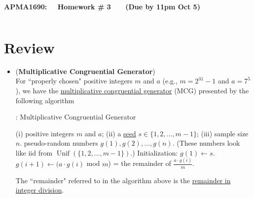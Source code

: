 \documentclass[11pt,letterpaper, leqno]{article}
\begin{document}
\begin{center}
{\bf \Large APMA1690: ~~Homework \# 3 ~~~(Due by 11pm Oct 5)}
\end{center}
\[\]
\medskip

\section{Review}

\begin{itemize}
    \item (\textbf{Multiplicative Congruential Generator}) \\
    For ``properly chosen" positive integers $m$ and $a$ (e.g., $m=2^{31}-1$ and $a=7^5$), we have the \href{https://en.wikipedia.org/wiki/Lehmer_random_number_generator}{multiplicative congruential generator} (MCG) presented by the following algorithm
\begin{algorithm}[H]
	\caption{: Multiplicative Congruential Generator}\label{algorithm: MCG}
	\begin{algorithmic}[1]
		\INPUT
        \noindent (i) positive integers $m$ and $a$; (ii) a \href{https://en.wikipedia.org/wiki/Random_seed}{seed} $s\in\{1,2,\ldots,m-1\}$; (iii) sample size $n$.
		\OUTPUT pseudo-random numbers $g(1), g(2), \ldots, g(n)$. (These numbers look like iid from $\operatorname{Unif}(\{1,2,\ldots,m-1\})$.)
		\STATE Initialization: $g(1)\leftarrow s$.
        \STATE $g(i+1) \leftarrow (a\cdot g(i)$ mod $m$) = the remainder of $\frac{a\cdot g(i)}{m}$.
		\ENDFOR
		\end{algorithmic}
\end{algorithm}

The ``remainder" referred to in the algorithm above is the \href{https://en.wikipedia.org/wiki/Remainder}{remainder in integer division}.
    

\end{itemize}
\end{document}
